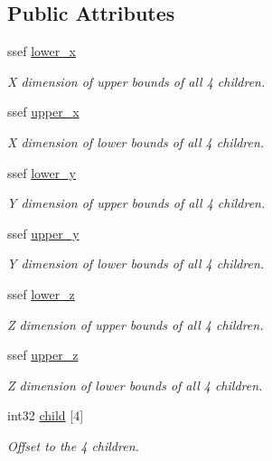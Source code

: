 \subsection*{Public Attributes}
\begin{DoxyCompactItemize}
\item 
ssef \hyperlink{structembree_1_1_b_v_h4_1_1_node_acd9383e7ba8258f434ff163257076dd4}{lower\_\-x}
\begin{DoxyCompactList}\small\item\em X dimension of upper bounds of all 4 children. \item\end{DoxyCompactList}\item 
ssef \hyperlink{structembree_1_1_b_v_h4_1_1_node_a327d179144dbd22cb63d6c951e63d54b}{upper\_\-x}
\begin{DoxyCompactList}\small\item\em X dimension of lower bounds of all 4 children. \item\end{DoxyCompactList}\item 
ssef \hyperlink{structembree_1_1_b_v_h4_1_1_node_a587ef15ee916db332c03dbd0f2ddbbec}{lower\_\-y}
\begin{DoxyCompactList}\small\item\em Y dimension of upper bounds of all 4 children. \item\end{DoxyCompactList}\item 
ssef \hyperlink{structembree_1_1_b_v_h4_1_1_node_ad9a39c79c1e3587abaf7f585d1f66e95}{upper\_\-y}
\begin{DoxyCompactList}\small\item\em Y dimension of lower bounds of all 4 children. \item\end{DoxyCompactList}\item 
ssef \hyperlink{structembree_1_1_b_v_h4_1_1_node_a1e1de6851b49bddfceb9e791df303990}{lower\_\-z}
\begin{DoxyCompactList}\small\item\em Z dimension of upper bounds of all 4 children. \item\end{DoxyCompactList}\item 
ssef \hyperlink{structembree_1_1_b_v_h4_1_1_node_abcca925fb283b982215882063cc5230f}{upper\_\-z}
\begin{DoxyCompactList}\small\item\em Z dimension of lower bounds of all 4 children. \item\end{DoxyCompactList}\item 
int32 \hyperlink{structembree_1_1_b_v_h4_1_1_node_a91f1fee63f300445c6abdc5c83205bb8}{child} \mbox{[}4\mbox{]}
\begin{DoxyCompactList}\small\item\em Offset to the 4 children. \item\end{DoxyCompactList}\end{DoxyCompactItemize}


